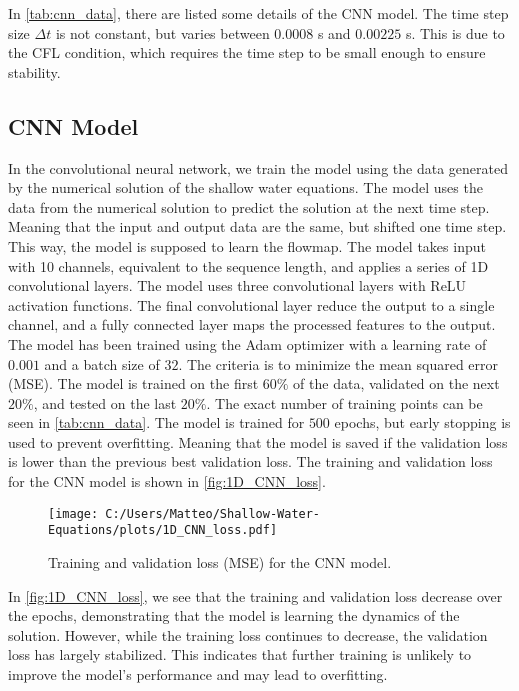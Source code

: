 In \autoref{tab:cnn_data}, there are listed some details of the CNN model.
The time step size $\Delta t$ is not constant, but varies between $0.0008$ s and $0.00225$ s.
This is due to the CFL condition, which requires the time step to be small enough to ensure stability.


\subsection*{CNN Model}
In the convolutional neural network, we train the model using the data generated by the numerical solution of the shallow water equations.
The model uses the data from the numerical solution to predict the solution at the next time step.
Meaning that the input and output data are the same, but shifted one time step. This way, the model is supposed to learn the flowmap.
The model takes input with 10 channels, equivalent to the sequence length, and applies a series of 1D convolutional layers.
The model uses three convolutional layers with ReLU activation functions.
The final convolutional layer reduce the output to a single channel, and a fully connected layer maps the processed features to the output.
The model has been trained using the Adam optimizer with a learning rate of $0.001$ and a batch size of $32$.
The criteria is to minimize the mean squared error (MSE).
The model is trained on the first $60\%$ of the data, validated on the next $20\%$, and tested on the last $20\%$.
The exact number of training points can be seen in \autoref{tab:cnn_data}.
The model is trained for $500$ epochs, but early stopping is used to prevent overfitting.
Meaning that the model is saved if the validation loss is lower than the previous best validation loss.
The training and validation loss for the CNN model is shown in \autoref{fig:1D_CNN_loss}.
\begin{figure}[H]
    \centering
    \texttt{[image: C:/Users/Matteo/Shallow-Water-Equations/plots/1D\_CNN\_loss.pdf]}
    \caption{Training and validation loss (MSE) for the CNN model.}\label{fig:1D_CNN_loss}
\end{figure}
In \autoref{fig:1D_CNN_loss}, we see that the training and validation loss decrease over the epochs, demonstrating that the model is learning the dynamics of the solution.
However, while the training loss continues to decrease, the validation loss has largely stabilized.
This indicates that further training is unlikely to improve the model's performance and may lead to overfitting.
